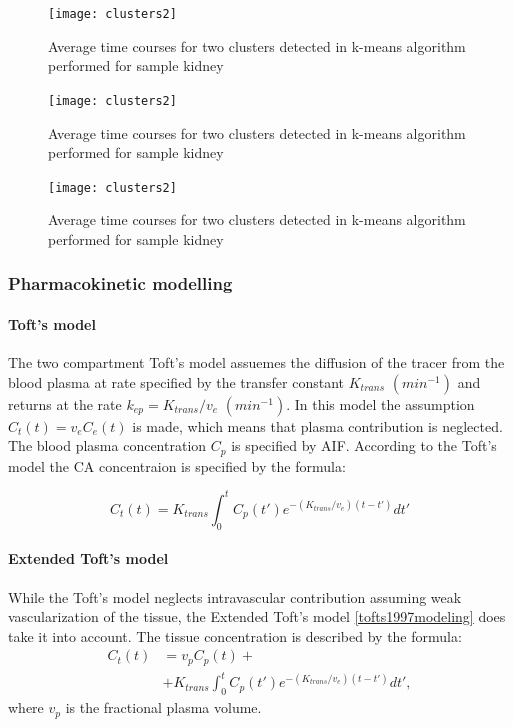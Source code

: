 \begin{figure}[H]
	\centering
	\texttt{[image: clusters2]}
\caption[Average time courses for two clusters detected in k-means algorithm]{Average time courses for two clusters detected in k-means algorithm performed for sample kidney}
\label{fig:median}
\end{figure}

\begin{figure}[H]
	\centering
	\texttt{[image: clusters2]}
\caption[Average time courses for two clusters detected in k-means algorithm]{Average time courses for two clusters detected in k-means algorithm performed for sample kidney}
\label{fig:derivative}
\end{figure}

\begin{figure}[H]
	\centering
	\texttt{[image: clusters2]}
\caption[Average time courses for two clusters detected in k-means algorithm]{Average time courses for two clusters detected in k-means algorithm performed for sample kidney}
\label{fig:conversion}
\end{figure}


\subsubsection{Pharmacokinetic modelling}
\paragraph{Toft's model}
The two compartment Toft's model \cite{tofts1991measurement} assuemes the diffusion of the tracer from the blood plasma at rate specified by the transfer constant $K_{trans}$ $(min^{-1})$ and returns at the rate $k_{ep} = K_{trans}/v_e$ $(min^{-1})$. In this model the assumption $C_t(t) = v_eC_e(t)$ is made, which means that plasma contribution is neglected. The blood plasma concentration $C_p$ is specified by AIF. According to the Toft's model the CA concentraion is specified by the formula:
 
\begin{equation}
	\label{eq:toft}
	C_{t}(t) = K_{trans}\int_{0}^{t}C_p(t')e^{-(K_{trans}/v_e)(t-t')}dt'  
\end{equation}

\paragraph{Extended Toft's model}
While the Toft's model neglects intravascular contribution assuming weak vascularization of the tissue, the Extended Toft's model \ref{tofts1997modeling} does take it into account. The tissue concentration is described by the formula:
\begin{align}
	\label{eq:extended_toft}
	\nonumber C_{t}(t) &= v_pC_p(t)+\\ 
	&+ K_{trans}\int_{0}^{t}C_p(t')e^{-(K_{trans}/v_e)(t-t')}dt', 
\end{align}
where $v_p$ is the fractional plasma volume. 

